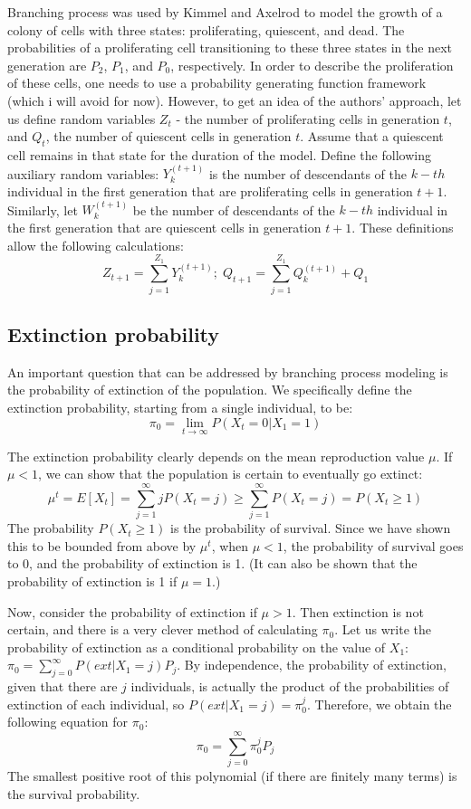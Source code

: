 \documentclass[11pt]{book}
\begin{document}
Branching process was used by Kimmel and Axelrod to model the growth of a colony of cells with three states: proliferating, quiescent, and dead. The probabilities of a proliferating cell transitioning to these three states in the next generation are $P_2$, $P_1$, and $P_0$, respectively. In order to describe the proliferation of these cells, one needs to use a probability generating function framework (which i will avoid for now). However, to get an idea of the authors' approach, let us define random variables $Z_t$ - the number of proliferating cells in generation $t$, and $Q_t$, the number of quiescent cells in generation $t$. Assume that a quiescent cell remains in that state for the duration of the model. Define the following auxiliary random variables: $Y_k^{(t+1)}$ is the number of descendants of the $k-th$ individual in the first generation that are proliferating cells in generation $t+1$. Similarly, let $W_k^{(t+1)}$ be the number of descendants  of the $k-th$ individual in the first generation that are quiescent cells in generation $t+1$. These definitions allow the following calculations:
$$ Z_{t+1} = \sum_{j=1}^{Z_1} Y_k^{(t+1)} ; \; Q_{t+1} = \sum_{j=1}^{Z_1} Q_k^{(t+1)} + Q_1$$

\subsection{Extinction probability}
An important question that can be addressed by branching process modeling is the probability of extinction of the population. We specifically define the extinction probability, starting from a single individual, to be:
$$\pi_0  = \lim_{t \rightarrow \infty} P (X_t = 0 | X_1 = 1)$$

The extinction probability clearly depends on the mean reproduction value $\mu$. If $\mu < 1$, we can show that the population is certain to eventually go extinct:
$$ \mu^t = E[X_t]  = \sum_{j=1}^\infty j P(X_t = j)  \geq \sum_{j=1}^\infty P(X_t = j) = P (X_t \geq 1) $$
The probability $P (X_t \geq 1)$ is the probability of survival. Since we have shown this to be bounded from above by $\mu^t$, when $\mu < 1$, the probability of survival goes to 0, and the probability of extinction is 1. (It can also be shown that the probability of extinction is 1 if $\mu =1$.)

Now, consider the probability of extinction if $\mu > 1$. Then extinction is not certain, and there is a very clever method of calculating $\pi_0$. Let us write the probability of extinction as a conditional probability on the value of $X_1$: $ \pi_0 = \sum_{j=0}^\infty P (ext | X_1 = j) P_j$. By independence, the probability of extinction, given that there are $j$ individuals, is actually the product of the probabilities of extinction of each individual, so $ P (ext | X_1 = j) = \pi_0^j$. Therefore, we obtain the following equation for $\pi_0$:
$$ \pi_0 = \sum_{j=0}^\infty \pi_0^j  P_j$$
The smallest positive root of this polynomial (if there are finitely many terms) is the survival probability. 
\end{document}
